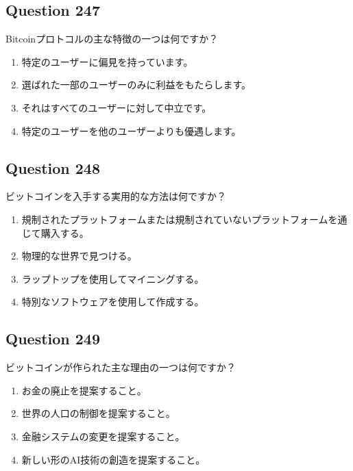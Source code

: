 \documentclass[12pt,a4paper]{article}
\begin{document}
\bigskip


\subsection*{Question 247}
Bitcoinプロトコルの主な特徴の一つは何ですか？

\begin{enumerate}[label=\Alph*., leftmargin=*]
\item 特定のユーザーに偏見を持っています。
\item 選ばれた一部のユーザーのみに利益をもたらします。
\item それはすべてのユーザーに対して中立です。
\item 特定のユーザーを他のユーザーよりも優遇します。
\end{enumerate}

\bigskip


\subsection*{Question 248}
ビットコインを入手する実用的な方法は何ですか？

\begin{enumerate}[label=\Alph*., leftmargin=*]
\item 規制されたプラットフォームまたは規制されていないプラットフォームを通じて購入する。
\item 物理的な世界で見つける。
\item ラップトップを使用してマイニングする。
\item 特別なソフトウェアを使用して作成する。
\end{enumerate}

\bigskip


\subsection*{Question 249}
ビットコインが作られた主な理由の一つは何ですか？

\begin{enumerate}[label=\Alph*., leftmargin=*]
\item お金の廃止を提案すること。
\item 世界の人口の制御を提案すること。
\item 金融システムの変更を提案すること。
\item 新しい形のAI技術の創造を提案すること。
\end{enumerate}

\bigskip
\end{document}
